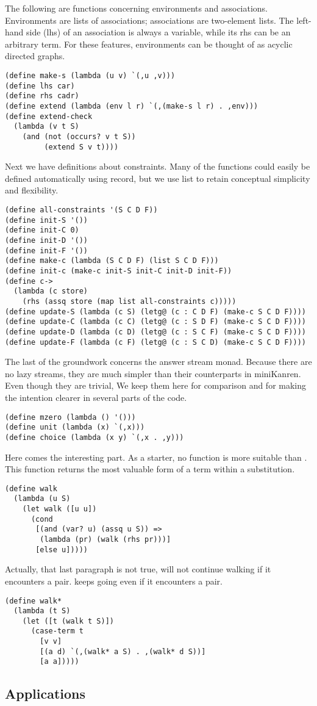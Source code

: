 The following are functions concerning environments and associations. Environments are lists of associations; associations are two-element lists. The left-hand side (lhs) of an association is always a variable, while its rhs can be an arbitrary term. For these features, environments can be thought of as acyclic directed graphs.
\begin{lstlisting}
(define make-s (lambda (u v) `(,u ,v)))
(define lhs car)
(define rhs cadr)
(define extend (lambda (env l r) `(,(make-s l r) . ,env)))
(define extend-check
  (lambda (v t S)
    (and (not (occurs? v t S))
         (extend S v t))))
\end{lstlisting}

Next we have definitions about constraints. Many of the functions could easily be defined automatically using record, but we use list to retain conceptual simplicity and flexibility.
\begin{lstlisting}
(define all-constraints '(S C D F))
(define init-S '())
(define init-C 0)
(define init-D '())
(define init-F '())
(define make-c (lambda (S C D F) (list S C D F)))
(define init-c (make-c init-S init-C init-D init-F))
(define c->
  (lambda (c store)
    (rhs (assq store (map list all-constraints c)))))
(define update-S (lambda (c S) (letg@ (c : C D F) (make-c S C D F))))
(define update-C (lambda (c C) (letg@ (c : S D F) (make-c S C D F))))
(define update-D (lambda (c D) (letg@ (c : S C F) (make-c S C D F))))
(define update-F (lambda (c F) (letg@ (c : S C D) (make-c S C D F))))
\end{lstlisting}

The last of the groundwork concerns the answer stream monad. Because there are no lazy streams, they are much simpler than their counterparts in miniKanren. Even though they are trivial, We keep them here for comparison and for making the intention clearer in several parts of the code.
\begin{lstlisting}
(define mzero (lambda () '()))
(define unit (lambda (x) `(,x)))
(define choice (lambda (x y) `(,x . ,y)))
\end{lstlisting}

Here comes the interesting part. As a starter, no function is more suitable than . This function returns the most valuable form of a term within a substitution.
\begin{lstlisting}
(define walk
  (lambda (u S)
    (let walk ([u u])
      (cond
       [(and (var? u) (assq u S)) =>
        (lambda (pr) (walk (rhs pr)))]
       [else u]))))
\end{lstlisting}

Actually, that last paragraph is not true,  will not continue walking if it encounters a pair.  keeps going even if it encounters a pair.
\begin{lstlisting}
(define walk*
  (lambda (t S)
    (let ([t (walk t S)])
      (case-term t
        [v v]
        [(a d) `(,(walk* a S) . ,(walk* d S))]
        [a a]))))
\end{lstlisting}

\subsection{Applications}